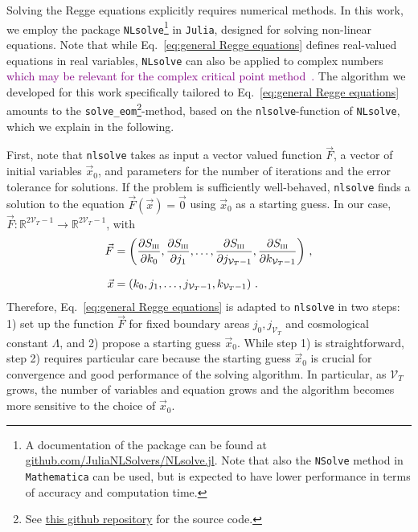 \documentclass[amsmath,amssymb,aps,twocolumn,superscriptaddress,nofootinbib]{revtex4-1}
\newcommand{\R}{\mathbb{R}}
\newcommand{\caj}[1]{\textcolor{purple}{#1}}
\begin{document}
Solving the Regge equations explicitly requires numerical methods. In this work, we employ the package \texttt{NLsolve}\footnote{
A documentation of the package can be found at \href{https://github.com/JuliaNLSolvers/NLsolve.jl}{github.com/JuliaNLSolvers/NLsolve.jl}. 
Note that also the \texttt{NSolve} method in \texttt{Mathematica} can be used, but is expected to have lower performance in terms of accuracy and computation time.
}
in \texttt{Julia}, designed for solving non-linear equations.
Note that while Eq.~\eqref{eq:general Regge equations} defines real-valued equations in real variables, \texttt{NLsolve} can also be applied to complex numbers \caj{which may be relevant for the complex critical point method~\cite{}.}
The algorithm we developed for this work specifically tailored to Eq.~\eqref{eq:general Regge equations} amounts to the \texttt{solve\_eom}\footnote{See \href{https://github.com/Jercheal/transfer_matrix/blob/main/transfer_matrix.jl}{this github repository} for the source code.}-method, based on the \texttt{nlsolve}-function of \texttt{NLsolve}, which we explain in the following.

First, note that \texttt{nlsolve} takes as input a vector valued function $\vec{F}$, a vector of initial variables $\vec{x}_0$, and parameters for the number of iterations and the error tolerance for solutions. 
If the problem is sufficiently well-behaved, \texttt{nlsolve} finds a solution to the equation $\vec{F}(\vec{x}) = \vec{0}$ using $\vec{x}_0$ as a starting guess. 
In our case, $\vec{F}:\R^{2\mathcal{V}_T-1}\longrightarrow \R^{2\mathcal{V}_T-1}$, with
%
\begin{align}
\vec{F} &= \left(\pdv{S_{\textsc{iii}}}{k_0},\pdv{S_{\textsc{iii}}}{j_1},\dots,\pdv{S_{\textsc{iii}}}{j_{\mathcal{V}_T-1}},\pdv{S_{\textsc{iii}}}{k_{\mathcal{V}_T-1}}\right)\,,\\[7pt]
\vec{x} &= \left(k_0,j_1,\dots,j_{\mathcal{V}_T-1},k_{\mathcal{V}_T-1}\right)\,.
\end{align}
%
Therefore, Eq.~\eqref{eq:general Regge equations} is adapted to \texttt{nlsolve} in two steps: 1) set up the function $\vec{F}$ for fixed boundary areas $j_0,j_{\mathcal{V}_T}$ and cosmological constant $\Lambda$, and 2) propose a starting guess $\vec{x}_0$.
While step 1) is straightforward, step 2) requires particular care because the starting guess $\vec{x}_0$ is crucial for convergence and good performance of the solving algorithm.
In particular, as $\mathcal{V}_T$ grows, the number of variables and equation grows and the algorithm becomes more sensitive to the choice of $\vec{x}_0$. 
\end{document}
